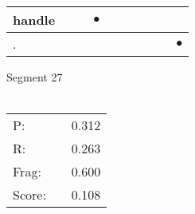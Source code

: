 \documentclass[landscape]{article}
\newcommand{\ssp}{\hspace{2pt}}
\newcommand{\mex}{\cellcolor{g}$\bullet$}
\begin{document}
\begin{tabular}{|l|p{10pt}|p{10pt}|p{10pt}|p{10pt}|p{10pt}|p{10pt}|p{10pt}|p{10pt}|p{10pt}|}
\hline
\ssp \cellcolor{ref2}handle \ssp&\hspace{2pt}&\hspace{2pt}&\hspace{2pt}\mex&\hspace{2pt}&\hspace{2pt}&\hspace{2pt}&\hspace{2pt}&\hspace{2pt}&\hspace{2pt}\\
\hline
\ssp \cellcolor{ref8}. \ssp&\hspace{2pt}&\hspace{2pt}&\hspace{2pt}&\hspace{2pt}&\hspace{2pt}&\hspace{2pt}&\hspace{2pt}&\hspace{2pt}&\hspace{2pt}\mex\\
\hline
\end{tabular}

\vspace{6pt}
\noindent Segment 27\\\\
\noindent\begin{tabular}{lm{12pt}r}
\hline
P:&&0.312\\
R:&&0.263\\
Frag:&&0.600\\
Score:&&0.108\\
\end{tabular}

\newpage
\end{document}
